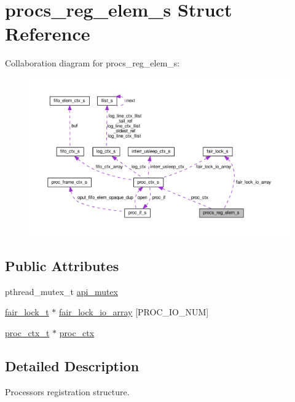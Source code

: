 \hypertarget{structprocs__reg__elem__s}{}\section{procs\+\_\+reg\+\_\+elem\+\_\+s Struct Reference}
\label{structprocs__reg__elem__s}


Collaboration diagram for procs\+\_\+reg\+\_\+elem\+\_\+s\+:\nopagebreak
\begin{figure}[H]
\begin{center}
\leavevmode
\includegraphics[width=350pt]{structprocs__reg__elem__s__coll__graph}
\end{center}
\end{figure}
\subsection*{Public Attributes}
\begin{DoxyCompactItemize}
\item 
pthread\+\_\+mutex\+\_\+t \hyperlink{structprocs__reg__elem__s_a9b7bb6d12868ba74184d95f1a2fdd2ab}{api\+\_\+mutex}
\item 
\hyperlink{structfair__lock__s}{fair\+\_\+lock\+\_\+t} $\ast$ \hyperlink{structprocs__reg__elem__s_a4de246450a9e79fe65ab600814311c6d}{fair\+\_\+lock\+\_\+io\+\_\+array} \mbox{[}P\+R\+O\+C\+\_\+\+I\+O\+\_\+\+N\+UM\mbox{]}
\item 
\hyperlink{proc_8h_ae264f89be30fc03f5053bc16d58cba05}{proc\+\_\+ctx\+\_\+t} $\ast$ \hyperlink{structprocs__reg__elem__s_aa394ff40393e8ca08c8f4c9b0c965698}{proc\+\_\+ctx}
\end{DoxyCompactItemize}


\subsection{Detailed Description}
Processors registration structure. 

